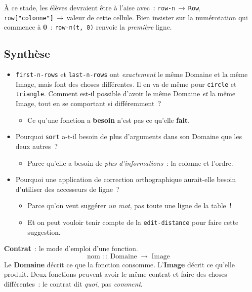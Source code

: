 \documentclass[12pt,a4paper]{article}
\begin{document}
\begin{instructornotes}
  À ce stade, les élèves devraient être à l'aise avec~:
  \texttt{row-n}\,$\to$\,\texttt{Row},\; \texttt{row["colonne"]}\,$\to$\,valeur de cette cellule.
  Bien insister sur la numérotation qui commence à \textbf{0}~: \texttt{row-n(t, 0)} renvoie la \emph{première} ligne.
\end{instructornotes}

\subsection{Synthèse}

\begin{thinkbox}
  \begin{itemize}
    \item \texttt{first-n-rows} et \texttt{last-n-rows} ont \emph{exactement} le même Domaine et la même Image, mais font des choses différentes. Il en va de même pour \texttt{circle} et \texttt{triangle}. Comment est-il possible d'avoir le même Domaine \emph{et} la même Image, tout en se comportant si différemment~?
    \begin{itemize}
      \item Ce qu'une fonction a \textbf{besoin} n'est pas ce qu'elle \textbf{fait}.
    \end{itemize}
    \item Pourquoi \texttt{sort} a-t-il besoin de plus d'arguments dans son Domaine que les deux autres~?
    \begin{itemize}
      \item Parce qu'elle a besoin de \emph{plus d'informations}~: la colonne et l'ordre.
    \end{itemize}
    \item Pourquoi une application de correction orthographique aurait-elle besoin d'utiliser des accesseurs de ligne~?
    \begin{itemize}
      \item Parce qu'on veut suggérer \emph{un mot}, pas toute une ligne de la table~!
      \item Et on peut vouloir tenir compte de la \texttt{edit-distance} pour faire cette suggestion.
    \end{itemize}
  \end{itemize}
\end{thinkbox}

\begin{keypointbox}
  \textbf{Contrat}~: le mode d'emploi d'une fonction.
  \[
  \text{nom} \;::\; \text{Domaine} \;\to\; \text{Image}
  \]
  Le \textbf{Domaine} décrit ce que la fonction consomme. L'\textbf{Image} décrit ce qu'elle produit. Deux fonctions peuvent avoir le même contrat et faire des choses différentes~: le contrat dit \emph{quoi}, pas \emph{comment}.
\end{keypointbox}
\end{document}
